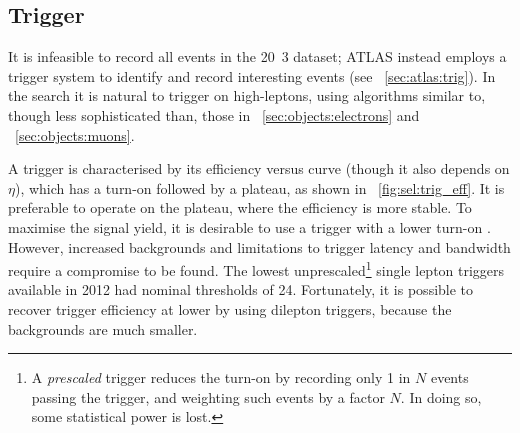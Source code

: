 \subsection{Trigger}
\label{sec:selection:trigger}

It is infeasible to record all events in the \unit{20.3}{\invfb} dataset; ATLAS instead 
employs a trigger system to identify and record interesting events (see 
\Section~\ref{sec:atlas:trig}). In the \HWWlvlv search it is natural to trigger on 
high-\pt leptons, using algorithms similar to, though less sophisticated than, those in 
\Section~\ref{sec:objects:electrons} and \Section~\ref{sec:objects:muons}.

A trigger is characterised by its efficiency versus \pt curve (though it also depends on 
$\eta$), which has a turn-on followed by a plateau, as shown in 
\Figure~\ref{fig:sel:trig_eff}. It is preferable to operate on the plateau, where the 
efficiency is more stable. To maximise the signal yield, it is desirable to use a trigger 
with a lower turn-on \pt. However, increased backgrounds and limitations to trigger 
latency and bandwidth require a compromise to be found. The lowest unprescaled\footnote{
	A \textit{prescaled} trigger reduces the turn-on \pt by recording only 1 in $N$ 
	events passing the trigger, and weighting such events by a factor $N$. In doing so, 
	some statistical power is lost.
}
single lepton triggers available in 2012 had nominal \pt thresholds of \unit{24}{\GeV}. 
Fortunately, it is possible to recover trigger efficiency at lower \pt by using dilepton 
triggers, because the backgrounds are much smaller.

